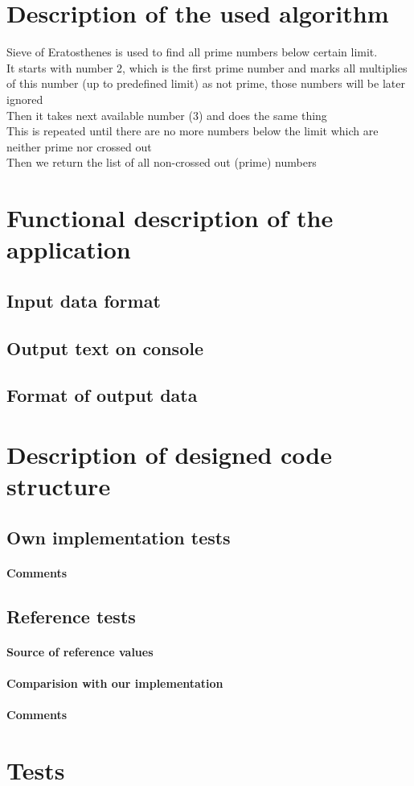 \documentclass[12pt]{article}
\begin{document}
\section{Description of the used algorithm}
Sieve of Eratosthenes is used to find all prime numbers below certain limit. \\ 
It starts with number 2, which is the first prime number and marks all multiplies of this number (up to predefined limit) as not prime, those numbers will be later ignored \\ 
Then it takes next available number (3) and does the same thing \\ 
This is repeated until there are no more numbers below the limit which are neither prime nor crossed out \\ 
Then we return the list of all non-crossed out (prime) numbers
\section{Functional description of the application}

\subsection{Input data format}
\subsection{Output text on console}
\subsection{Format of output data}
\section{Description of designed code structure}
\subsection{Own implementation tests}
\paragraph{Comments}
\subsection{Reference tests}
\paragraph{Source of reference values}
\paragraph{Comparision with our implementation}
\paragraph{Comments}
\section{Tests}
\end{document}
